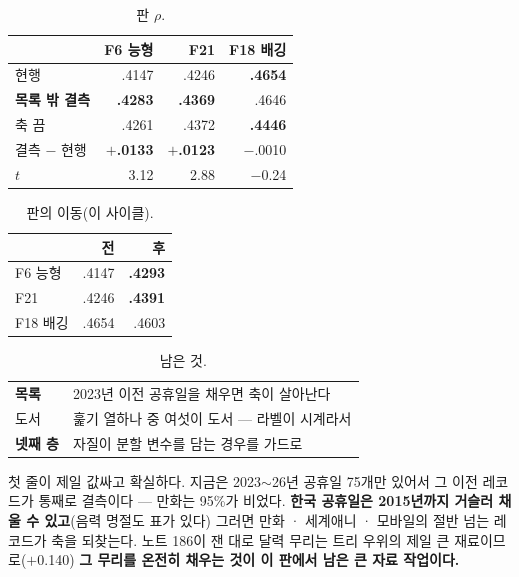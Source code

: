\documentclass[10pt]{article}
\begin{document}
\begin{table}[t]
\centering\tsize
\caption{판 $\rho$.}
\begin{tabular}{lrrr}
\toprule
& F6 능형 & F21 & F18 배깅 \\
\midrule
현행 & .4147 & .4246 & \textbf{.4654} \\
\textbf{목록 밖 결측} & \textbf{.4283} & \textbf{.4369} & .4646 \\
축 끔 & .4261 & .4372 & \textbf{.4446} \\
\midrule
결측 $-$ 현행 & \textbf{$+$.0133} & \textbf{$+$.0123} & $-$.0010 \\
$t$ & 3.12 & 2.88 & $-$0.24 \\
\bottomrule
\end{tabular}
\end{table}



\begin{table}[t]
\centering\tsize
\caption{판의 이동(이 사이클).}
\begin{tabular}{lrr}
\toprule
& 전 & 후 \\
\midrule
F6 능형 & .4147 & \textbf{.4293} \\
F21 & .4246 & \textbf{.4391} \\
F18 배깅 & .4654 & .4603 \\
\bottomrule
\end{tabular}
\end{table}

\begin{table}[t]
\centering\tsize
\caption{남은 것.}
\begin{tabular}{ll}
\toprule
\textbf{목록} & 2023년 이전 공휴일을 채우면 축이 살아난다 \\
도서 & 훑기 열하나 중 여섯이 도서 --- 라벨이 시계라서 \\
\textbf{넷째 층} & 자질이 분할 변수를 담는 경우를 가드로 \\
\bottomrule
\end{tabular}
\end{table}

첫 줄이 제일 값싸고 확실하다. 지금은 2023$\sim$26년 공휴일 75개만 있어서
그 이전 레코드가 통째로 결측이다 --- 만화는 95\%가 비었다. \textbf{한국
공휴일은 2015년까지 거슬러 채울 수 있고}(음력 명절도 표가 있다) 그러면
만화 · 세계애니 · 모바일의 절반 넘는 레코드가 축을 되찾는다. 노트 186이
잰 대로 달력 무리는 트리 우위의 제일 큰 재료이므로($+$0.140) \textbf{그
무리를 온전히 채우는 것이 이 판에서 남은 큰 자료 작업이다.}
\end{document}
